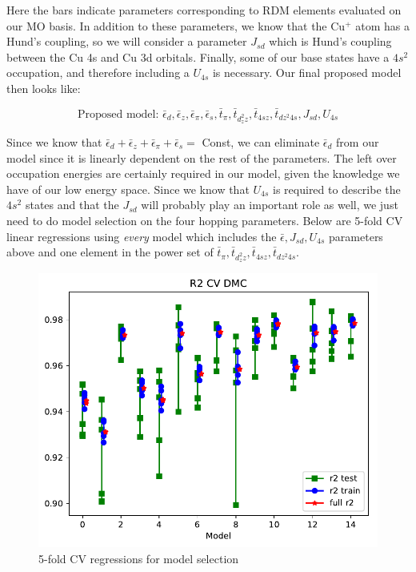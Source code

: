 \documentclass{article}
\begin{document}
Here the bars indicate parameters corresponding to RDM elements evaluated on our MO basis. In addition to these parameters, we know that the Cu$^+$ atom has a Hund's coupling, so we will consider a parameter $J_{sd}$ which is Hund's coupling between the Cu 4s and Cu 3d orbitals. Finally, some of our base states have a $4s^2$ occupation, and therefore including a $U_{4s}$ is necessary. Our final proposed model then looks like: 

$$ \boxed{\text{Proposed model: }\bar{\epsilon}_d, \bar{\epsilon}_z, \bar{\epsilon}_\pi, \bar{\epsilon}_s, \bar{t}_\pi, \bar{t}_{d_z^2 z}, \bar{t}_{4s z}, \bar{t}_{dz^2 4s}, J_{sd}, U_{4s}}$$

Since we know that $\bar{\epsilon}_d + \bar{\epsilon}_z + \bar{\epsilon}_\pi + \bar{\epsilon}_s = $ Const, we can eliminate $\bar{\epsilon}_d$ from our model since it is linearly dependent on the rest of the parameters. The left over occupation energies are certainly required in our model, given the knowledge we have of our low energy space. Since we know that $U_{4s}$ is required to describe the $4s^2$ states and that the $J_{sd}$ will probably play an important role as well, we just need to do model selection on the four hopping parameters. Below are 5-fold CV linear regressions using \textit{every} model which includes the $\bar{\epsilon}, J_{sd}, U_{4s}$ parameters above and one element in the power set of $\bar{t}_\pi, \bar{t}_{d_z^2 z}, \bar{t}_{4s z}, \bar{t}_{dz^2 4s}$. 

\begin{figure}
\includegraphics[width=1.0\textwidth]{../qwalk/ub3lyp_s1_/analysis/cv_valid.pdf}
\caption{5-fold CV regressions for model selection}
\end{figure}
\end{document}
